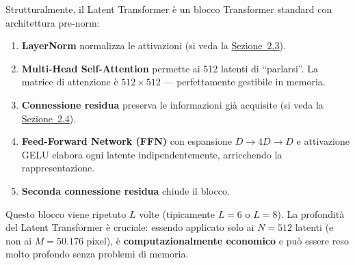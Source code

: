 \documentclass[12pt,a4paper]{article}
\begin{document}
Strutturalmente, il Latent Transformer \`e un blocco Transformer standard con architettura pre-norm:
\begin{enumerate}[label=(\roman*), leftmargin=*]
    \item \textbf{LayerNorm} normalizza le attivazioni (si veda la \hyperref[sec:layernorm]{Sezione~2.3}).
    \item \textbf{Multi-Head Self-Attention} permette ai 512 latenti di ``parlarsi''. La matrice di attenzione \`e $512 \times 512$ --- perfettamente gestibile in memoria.
    \item \textbf{Connessione residua} preserva le informazioni gi\`a acquisite (si veda la \hyperref[sec:residual]{Sezione~2.4}).
    \item \textbf{Feed-Forward Network (FFN)} con espansione $D \to 4D \to D$ e attivazione GELU elabora ogni latente indipendentemente, arricchendo la rappresentazione.
    \item \textbf{Seconda connessione residua} chiude il blocco.
\end{enumerate}

Questo blocco viene ripetuto $L$ volte (tipicamente $L = 6$ o $L = 8$). La profondit\`a del Latent Transformer \`e cruciale: essendo applicato solo ai $N = 512$ latenti (e non ai $M = 50.176$ pixel), \`e \textbf{computazionalmente economico} e pu\`o essere reso molto profondo senza problemi di memoria.


\end{document}
